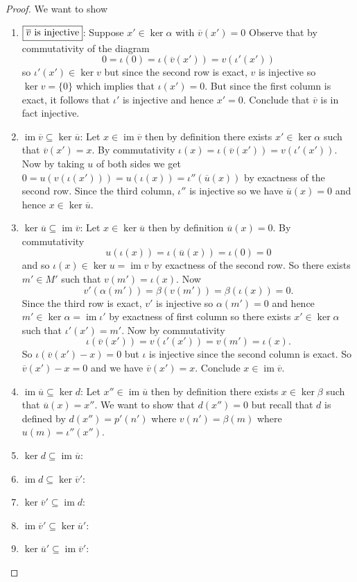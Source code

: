 \documentclass[8pt]{amsart}
\theoremstyle{plain}%
\theoremstyle{definition}
\theoremstyle{remark}
\numberwithin{equation}{section}
\newcommand{\im}{\operatorname{im}}
\begin{document}
\begin{proof}
	We want to show
	\begin{enumerate}
		\item $\boxed{\overline v$ is injective$}$: Suppose $x' \in \ker \alpha$ with $\overline v (x') = 0$ Observe that by commutativity of the diagram $$0 = \iota(0) = \iota(\overline v (x')) = v(\iota'(x'))$$ so $\iota'(x') \in \ker v$ but since the second row is exact, $v$ is injective so $\ker v = \{0\}$ which implies that $\iota(x') = 0$. But since the first column is exact, it follows that $\iota'$ is injective and hence $x' = 0$. Conclude that $\overline v$ is in fact injective.

		\item $\boxed{\im \overline v \subseteq \ker \overline u}$: Let $x \in \im \overline v$ then by definition there exists $x' \in \ker \alpha$ such that $\overline v(x') = x$. By commutativity $\iota(x) = \iota(\overline v(x')) = v(\iota'(x'))$. Now by taking $u$ of both sides we get $0 = u(v(\iota(x'))) = u(\iota(x)) = \iota''(\overline u(x))$ by exactness of the second row. Since the third column, $\iota''$ is injective so we have $\overline u(x) = 0$ and hence $x \in \ker \overline u$.

		\item $\boxed{\ker \overline u \subseteq \im \overline v}$: Let $x \in \ker \overline u$ then by definition $\overline u (x) = 0$. By commutativity $$u(\iota(x)) = \iota(\overline u(x)) = \iota(0) = 0$$ and so $\iota(x) \in \ker u = \im v$ by exactness of the second row. So there exists $m' \in M'$ such that $v(m') = \iota(x)$. Now $$v'(\alpha(m')) = \beta(v(m')) = \beta(\iota(x)) = 0.$$ Since the third row is exact, $v'$ is injective so $\alpha(m') = 0$ and hence $m' \in \ker \alpha = \im \iota'$ by exactness of first column so there exists $x' \in \ker \alpha$ such that $\iota'(x') = m'$. Now by commutativity $$\iota(\overline v(x')) = v(\iota'(x')) = v(m') = \iota(x).$$ So $\iota(\overline v (x') - x) = 0$ but $\iota$ is injective since the second column is exact. So $\overline v(x') - x = 0$ and we have $\overline v(x') = x$. Conclude $x \in \im \overline v$.

		\item $\boxed{\im \overline u \subseteq \ker d}$: Let $x'' \in \im \overline u$ then by definition there exists $x \in \ker \beta$ such that $\overline u(x) = x''$. We want to show that $d(x'') = 0$ but recall that $d$ is defined by $d(x'') = p'(n')$ where $v(n') = \beta(m)$ where $u(m) = \iota''(x'')$.

		\item $\ker d \subseteq \im \overline u$:
		\item $\im d \subseteq \ker \overline v'$:
		\item $\ker \overline v' \subseteq \im d$:
		\item $\im \overline v' \subseteq \ker \overline u'$:
		\item $\ker \overline u' \subseteq \im \overline v'$:


\end{enumerate}
\end{proof}
\end{document}
